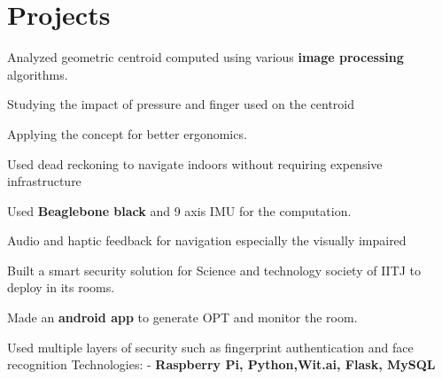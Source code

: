 \documentclass[]{deedy-resume-openfont}
\begin{document}
\hfill
\begin{minipage}[t]{0.66\textwidth} 


\section{Projects}
\vspace{\topsep} 
\begin{tightemize}
\item Analyzed geometric centroid computed using various \textbf{image processing} algorithms.
\item Studying the impact of pressure and finger used on the centroid
\item  Applying the concept for better ergonomics. \end{tightemize}
\sectionsep

\begin{tightemize}
\item Used dead reckoning to navigate indoors without requiring expensive infrastructure

\item Used \textbf{Beaglebone black} and 9 axis IMU for the computation.
\item Audio and haptic feedback for navigation especially the visually impaired\end{tightemize}
\sectionsep



\begin{tightemize}
\item Built a smart security solution for Science and technology society of IITJ to deploy in its rooms.
\item Made an \textbf{android app} to generate OPT and monitor the room.
\item Used multiple layers of security such as fingerprint authentication and face recognition 
Technologies: - \textbf{Raspberry Pi, Python,Wit.ai, Flask, MySQL}
\end{tightemize}
\sectionsep




\end{minipage}
\end{document}
